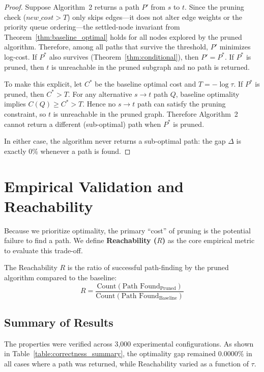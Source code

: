 \begin{proof}
Suppose Algorithm~2 returns a path $P'$ from $s$ to $t$. Since the pruning check ($\mathit{new\_cost} > T$) only skips edges---it does not alter edge weights or the priority queue ordering---the settled-node invariant from Theorem~\ref{thm:baseline_optimal} holds for all nodes explored by the pruned algorithm. Therefore, among all paths that survive the threshold, $P'$ minimizes log-cost. If $P^*$ also survives (Theorem~\ref{thm:conditional}), then $P' = P^*$. If $P^*$ is pruned, then $t$ is unreachable in the pruned subgraph and no path is returned.

To make this explicit, let $C^*$ be the baseline optimal cost and $T=-\log\tau$. If $P^*$ is pruned, then $C^*>T$. For any alternative $s\to t$ path $Q$, baseline optimality implies $C(Q)\ge C^*>T$. Hence no $s\to t$ path can satisfy the pruning constraint, so $t$ is unreachable in the pruned graph. Therefore Algorithm~2 cannot return a different (sub-optimal) path when $P^*$ is pruned.

In either case, the algorithm never returns a sub-optimal path: the gap $\Delta$ is exactly 0\% whenever a path is found.
\end{proof}

\section{Empirical Validation and Reachability}

Because we prioritize optimality, the primary ``cost'' of pruning is the potential failure to find a path. We define \textbf{Reachability ($R$)} as the core empirical metric to evaluate this trade-off.

\begin{definition}[Reachability]
The Reachability $R$ is the ratio of successful path-finding by the pruned algorithm compared to the baseline:
\\[-1em]
\[ R = \frac{\text{Count}(\text{Path Found}_{\text{Pruned}})}{\text{Count}(\text{Path Found}_{\text{Baseline}})} \]
\end{definition}



\subsection{Summary of Results}

The properties were verified across 3,000 experimental configurations. As shown in Table~\ref{table:correctness_summary}, the optimality gap remained $0.0000\%$ in all cases where a path was returned, while Reachability varied as a function of $\tau$.

